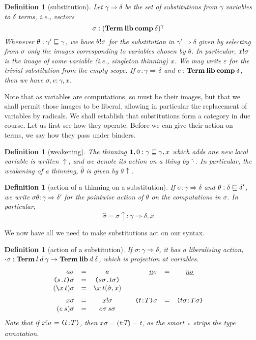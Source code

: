 \documentclass{jfp1}
\newtheorem{definition}[theorem]{Definition}
\newcommand{\emp}{\varepsilon}
\newcommand{\Pa}[1]{\texttt{(}#1\texttt{)}}
\newcommand{\dt}{\texttt{.}}
\newcommand{\cn}[2]{\Pa{#1 \dt #2}}
\newcommand{\hb}{\texttt{:}}
\newcommand{\ra}[2]{\Pa{#1 \hb #2}}
\newcommand{\Ne}{\underline}
\begin{document}
\newcommand{\su}{\Rightarrow}
\begin{definition}[substitution]
  Let $\gamma\su\delta$ be the set of substitutions from $\gamma$ variables to $\delta$ terms,
  i.e., vectors \[\sigma : (\mathbf{Term}\:\textbf{lib}\:\textbf{comp}\:\delta)^\gamma\]
  Whenever $\theta : \gamma'\sqsubseteq\gamma$, we have $\theta!\sigma$
  for the substitution in $\gamma'\su\delta$ given by selecting from
  $\sigma$ only the images corresponding to variables chosen by
  $\theta$. In particular, $x!\sigma$ is the image of some variable
  (i.e., singleton thinning)
  $x$. 
  We may write $\emp$ for the trivial
  substitution from the empty scope. If $\sigma : \gamma \su \delta$
  and $e : \mathbf{Term}\:\textbf{lib}\:\textbf{comp}\:\delta$, then we have $\sigma,e : \gamma,x$.
\end{definition}

Note that as variables are computations, so must be their images, but that we shall permit
those images to be liberal, allowing in particular the replacement of variables by radicals.
We shall establish that substitutions form a category in due
course. Let us first see how they operate. Before we can give their action on terms, we say how they
pass under binders.

\newcommand{\wk}{\uparrow}
\newcommand{\wka}{\hat}
\begin{definition}[weakening]
  The thinning $\mathbf{1},0 : \gamma\sqsubseteq\gamma,x$ which adds one new local variable is written
  $\wk$, and we denote its action on a thing by $\wka\cdot$. In particular, the weakening
  of a thinning, $\wka\theta$ is given by $\theta\wk$.
\end{definition}

\begin{definition}[action of a thinning on a substitution]
  If $\sigma:\gamma\su\delta$ and $\theta:\delta\sqsubseteq\delta'$, we
  write $\sigma\theta:\gamma\su\delta'$ for the pointwise action of
  $\theta$ on the computations in $\sigma$. In particular,
  \[
    \wka\sigma = \sigma\wk : \gamma\su\delta,x
    \]
\end{definition}

We now have all we need to make substitutions act on our syntax.

\begin{definition}[action of a substitution]
  If $\sigma:\gamma\su \delta$, it has a liberalising action,
  $\cdot\sigma:\mathbf{Term}\:l\:d\:\gamma\to\mathbf{Term}\:\textbf{lib}\:d\:\delta$, which is projection
  at variables.
  \[
    \begin{array}{rlc@{\qquad}rlc}
      a\sigma & = & a & \Ne n\sigma & = & \Ne{n\sigma} \\
      \cn st\sigma & = & \cn{s\sigma}{t\sigma} && \\
      (\la x t)\sigma & = & \la x t(\wka\sigma,x) && \medskip\\
      x\sigma & = & \sel x\sigma    & \ra tT\sigma & = & \ra{t\sigma}{T\sigma} \\
      (e\:s)\sigma & = & e\sigma\:s\sigma
    \end{array}
  \]
  Note that if $\sel x\sigma = \ra tT$, then $\Ne x\sigma = \Ne{\ra tT} =
  t$, as the smart $\Ne\cdot$ strips the type annotation.
\end{definition}
\end{document}
